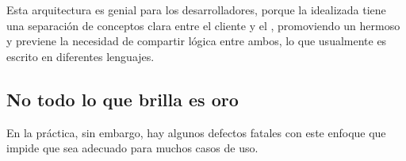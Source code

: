 Esta arquitectura es genial para los desarrolladores, porque la idealizada \singlePageAppINT tiene una separación de conceptos clara entre el cliente y el \serverAS, promoviendo un hermoso \workflowCPT y previene la necesidad de compartir lógica entre ambos, lo que usualmente es escrito en diferentes lenguajes.

\subsection{No todo lo que brilla es oro}

En la práctica, sin embargo, hay algunos defectos fatales con este enfoque que impide que sea adecuado para muchos casos de uso.


